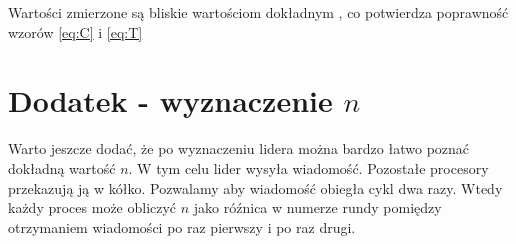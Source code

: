 \documentclass[11pt,a4paper]{article}
\begin{document}
 Wartości zmierzone są bliskie wartościom dokładnym , co potwierdza poprawność wzorów \eqref{eq:C} i \eqref{eq:T} 

\section{Dodatek - wyznaczenie $n$}
Warto jeszcze dodać, że po wyznaczeniu lidera można bardzo łatwo poznać dokładną wartość $n$. W tym celu lider wysyła wiadomość. 
Pozostałe procesory przekazują ją w kółko. Pozwalamy aby wiadomość obiegła cykl dwa razy. Wtedy każdy proces może obliczyć $n$ jako róźnica w numerze rundy
pomiędzy otrzymaniem wiadomości po raz pierwszy i po raz drugi.
\end{document}
